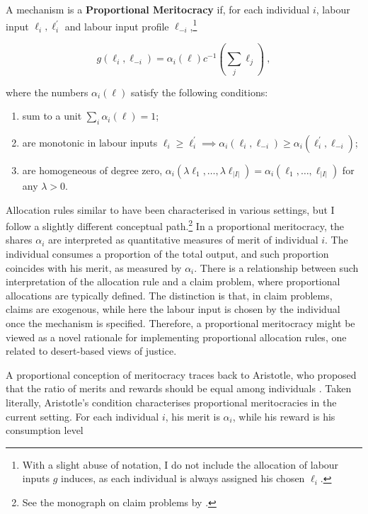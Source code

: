 \begin{definition}\label{def:prop}
	A mechanism is a \textbf{Proportional Meritocracy} if, for each individual \( i \), labour input \( \ell_i, \ell^{\prime}_{i} \) and labour input profile \( \ell_{-i} \),\footnote{With a slight abuse of notation, I do not include the allocation of labour inputs \( g \) induces, as each individual is always assigned his chosen \( \ell_i \).}

	\[ g ( \ell_i, \ell_{-i} ) = \alpha_i(\ell) c^{-1}\left(\sum_{j} \ell_j\right) \: ,\]

	where the numbers \( \alpha_i(\ell) \) satisfy the following conditions:
	\begin{enumerate}
		\item sum to a unit \( \sum_{i} \alpha_i(\ell) = 1 \);
		\item are monotonic in labour inputs \( \ell_i \geq \ell_i^{\prime} \implies \alpha_i (\ell_i, \ell_{-i} ) \geq \alpha_i (\ell_i^{\prime}, \ell_{-i} ) \);
		\item are homogeneous of degree zero, \( \alpha_i (\lambda \ell_1, \ldots, \lambda \ell_{|I|} )=\alpha_i (\ell_1, \ldots, \ell_{|I|} ) \) for any \( \lambda>0 \).
	\end{enumerate}

\end{definition}

Allocation rules similar to  have been characterised in various settings, but I follow a slightly different conceptual path.\footnote{See the monograph on claim problems by \cite{thomsonHowDivideWhen2019}.} In a proportional meritocracy, the shares \( \alpha_i \) are interpreted as quantitative measures of merit of individual \( i \). The individual consumes a proportion of the total output, and such proportion coincides with his merit, as measured by \( \alpha_i \). There is a relationship between such interpretation of the allocation rule and a claim problem, where proportional allocations are typically defined. The distinction is that, in claim problems, claims are exogenous, while here the labour input is chosen by the individual once the mechanism is specified. Therefore, a proportional meritocracy might be viewed as a novel rationale for implementing proportional allocation rules, one related to desert-based views of justice.

A proportional conception of meritocracy traces back to Aristotle, who proposed that the ratio of merits and rewards should be equal among individuals \citep{sep-meritocracy}. Taken literally, Aristotle's condition characterises proportional meritocracies in the current setting. For each individual \( i \), his merit is \( \alpha_i \), while his reward is his consumption level

